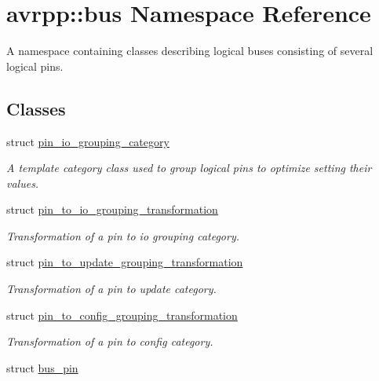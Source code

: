 \hypertarget{namespaceavrpp_1_1bus}{
\section{avrpp::bus Namespace Reference}
\label{namespaceavrpp_1_1bus}
}


A namespace containing classes describing logical buses consisting of several logical pins.  


\subsection*{Classes}
\begin{DoxyCompactItemize}
\item 
struct \hyperlink{structavrpp_1_1bus_1_1pin__io__grouping__category}{pin\_\-io\_\-grouping\_\-category}
\begin{DoxyCompactList}\small\item\em A template category class used to group logical pins to optimize setting their values. \item\end{DoxyCompactList}\item 
struct \hyperlink{structavrpp_1_1bus_1_1pin__to__io__grouping__transformation}{pin\_\-to\_\-io\_\-grouping\_\-transformation}
\begin{DoxyCompactList}\small\item\em Transformation of a pin to io grouping category. \item\end{DoxyCompactList}\item 
struct \hyperlink{structavrpp_1_1bus_1_1pin__to__update__grouping__transformation}{pin\_\-to\_\-update\_\-grouping\_\-transformation}
\begin{DoxyCompactList}\small\item\em Transformation of a pin to update category. \item\end{DoxyCompactList}\item 
struct \hyperlink{structavrpp_1_1bus_1_1pin__to__config__grouping__transformation}{pin\_\-to\_\-config\_\-grouping\_\-transformation}
\begin{DoxyCompactList}\small\item\em Transformation of a pin to config category. \item\end{DoxyCompactList}\item 
struct \hyperlink{structavrpp_1_1bus_1_1bus__pin}{bus\_\-pin}

\end{DoxyCompactItemize}
